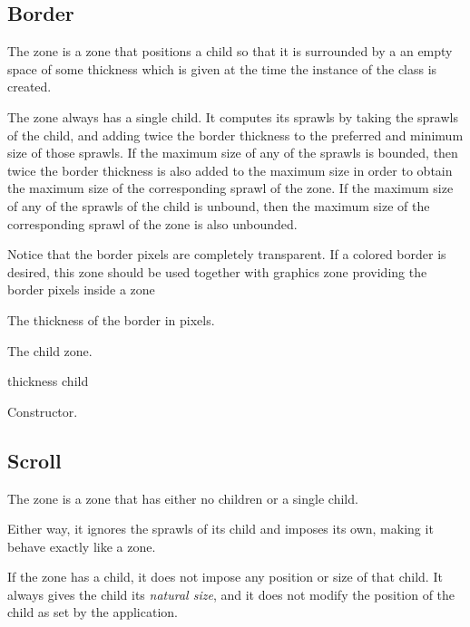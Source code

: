 \subsection{Border}
\label{sec-zones-layout-border}

The  zone is a zone that positions a child so that it is
surrounded by a an empty space of some thickness which is given at the
time the instance of the  class is created.

The  zone always has a single child.  It computes its
sprawls by taking the sprawls of the child, and adding twice the border
thickness to the preferred and minimum size of those sprawls.  If the
maximum size of any of the sprawls is bounded, then twice the border
thickness is also added to the maximum size in order to obtain the
maximum size of the corresponding sprawl of the  zone.
If the maximum size of any of the sprawls of the child is unbound,
then the maximum size of the corresponding sprawl of the 
zone is also unbounded.

Notice that the border pixels are completely transparent.  If a
colored border is desired, this zone should be used together with
graphics zone providing the border pixels inside a  zone



The thickness of the border in pixels.  


The child zone.

 {thickness child}

Constructor.

\subsection{Scroll}

The  zone is a zone that has either no children or a single
child.  

Either way, it ignores the sprawls of its child and imposes its own,
making it behave exactly like a  zone.  

If the  zone has a child, it does not impose any position
or size of that child.  It always gives the child its \emph{natural
  size}, and it does not modify the position of the child as set by
the application.

